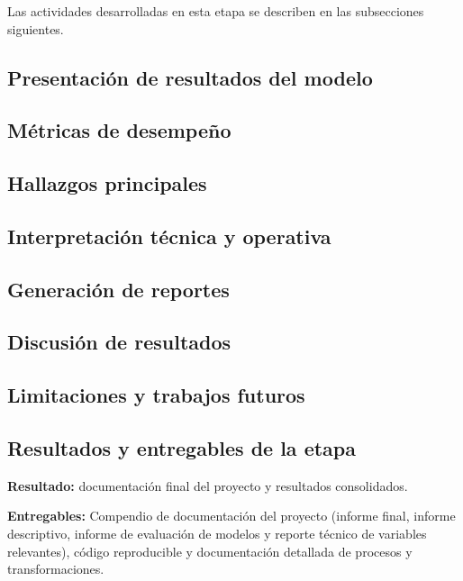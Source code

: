 Las actividades desarrolladas en esta etapa se describen en las subsecciones siguientes.

\subsection{Presentación de resultados del modelo}

\subsection{Métricas de desempeño}

\subsection{Hallazgos principales}

\subsection{Interpretación técnica y operativa}

\subsection{Generación de reportes}

\subsection{Discusión de resultados}

\subsection{Limitaciones y trabajos futuros}

\subsection{Resultados y entregables de la etapa}

\textbf{Resultado:} documentación final del proyecto y resultados consolidados.

\textbf{Entregables:} Compendio de documentación del proyecto (informe final, informe descriptivo, informe de evaluación de modelos y reporte técnico de variables relevantes), código reproducible y documentación detallada de procesos y transformaciones.
   


    
    
